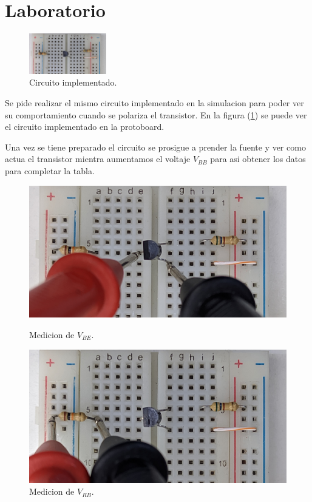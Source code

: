   \section{Laboratorio}
    \begin{figure}
      \vspace{-0.5cm}
      \centering
      \includegraphics[width=0.3\textwidth]{pictures/prot_crkt-1.jpg}
      \caption{Circuito implementado.} 
      \label{fig:prot_polariz}
    \end{figure}
    Se pide realizar el mismo circuito implementado en la simulacion para poder ver su comportamiento cuando se polariza
    el transistor. En la figura (\ref{fig:prot_polariz}) se puede ver el circuito implementado en la protoboard.

    Una vez se tiene preparado el circuito se prosigue a prender la fuente y ver como actua el transistor mientra
    aumentamos el voltaje $V_{BB}$ para asi obtener los datos para completar la tabla.

    \begin{figure}[H]
      \centering
      \begin{minipage}{0.49\textwidth}
        \includegraphics[width=1\textwidth]{pictures/prot_crkt-1_Vbe.jpg}
        \caption{Medicion de $V_{BE}$.}
      \end{minipage}
      \begin{minipage}{0.49\textwidth}
        \includegraphics[width=1\textwidth]{pictures/prot_crkt-1_Vrb.jpg}
        \caption{Medicion de $V_{RB}$.}
      \end{minipage}
    \end{figure}

